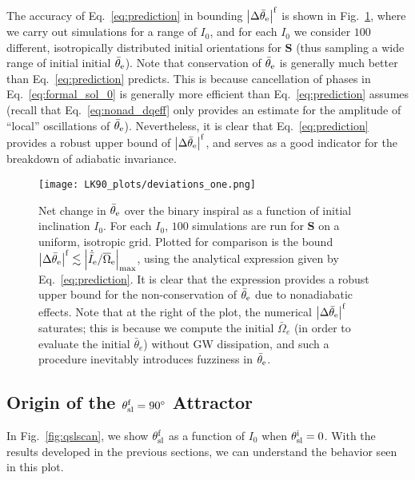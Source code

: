 \documentclass[
        twocolumn,
        twocolappendix
    ]{aastex63}
\newcommand*{\abs}[1]{\left|#1\right|}
\renewcommand*{\bm}[1]{\boldsymbol{\mathbf{#1}}}
\begin{document}
The accuracy of Eq.~\eqref{eq:prediction} in bounding $\abs{\Delta
\bar{\theta}_{\rm e}}^{\rm f}$ is shown in Fig.~\ref{fig:deviations}, where we
carry out simulations for a range of $I_0$, and for each $I_0$ we consider $100$
different, isotropically distributed initial orientations for $\bm{S}$ (thus
sampling a wide range of initial initial $\bar{\theta}_{\rm e}$). Note that
conservation of $\bar{\theta}_{\rm e}$ is generally much better than
Eq.~\eqref{eq:prediction} predicts. This is because cancellation of phases in
Eq.~\eqref{eq:formal_sol_0} is generally more efficient than
Eq.~\eqref{eq:prediction} assumes (recall that Eq.~\eqref{eq:nonad_dqeff} only
provides an estimate for the amplitude of ``local'' oscillations of
$\bar{\theta}_{\rm e}$). Nevertheless, it is clear that
Eq.~\eqref{eq:prediction} provides a robust upper bound of
$\abs{\Delta\bar{\theta}_{\rm e}}^{\rm f}$, and serves as a good indicator for
the breakdown of adiabatic invariance.
\begin{figure}
    \centering
    \texttt{[image: LK90\_plots/deviations\_one.png]}
    \caption{Net change in $\bar{\theta}_{\rm e}$ over the binary inspiral as a
    function of initial inclination $I_0$. For each $I_0$, $100$ simulations are
    run for $\bm{S}$ on a uniform, isotropic grid. Plotted for comparison is the
    bound $\abs{\Delta \bar{\theta}_{\rm e}}^{\rm f} \lesssim
    \abs{\dot{\bar{I}}_{\rm e} / \overline{\Omega}_{\rm e}}_{\max}$, using the
    analytical expression given by Eq.~\eqref{eq:prediction}. It is clear that the
    expression provides a robust upper bound for the non-conservation of
    $\bar{\theta}_{\rm e}$ due to nonadiabatic effects. Note that at the right of the
    plot, the numerical $\abs{\Delta \bar{\theta}_{\rm e}}^{\rm f}$ saturates;
    this is because we compute the initial $\bar{\Omega}_e$ (in order to
    evaluate the initial $\bar\theta_e$) without GW dissipation, and such a
    procedure inevitably introduces fuzziness in $\bar{\theta}_{\rm e}$.
    }\label{fig:deviations}
\end{figure}

\subsection{Origin of the $\theta_{\rm sl}^{\rm f} = 90^\circ$ Attractor
}\label{eq:effect}

In Fig.~\ref{fig:qslscan}, we show $\theta_{\rm sl}^{\rm f}$ as a function of
$I_0$ when $\theta_{\rm sl}^{\rm i} = 0$. With the results developed in the
previous sections, we can understand the behavior seen in this plot.
\end{document}
